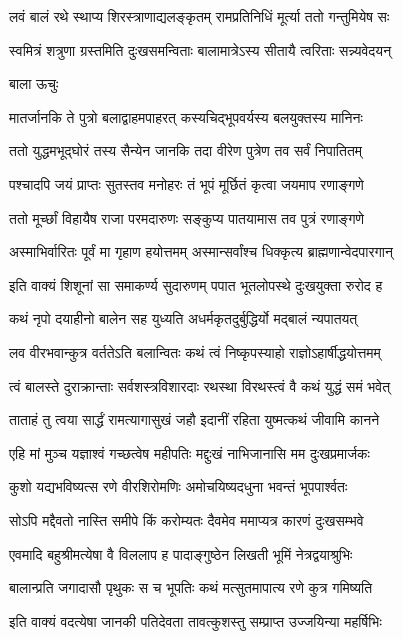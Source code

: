 \twolineshloka
{लवं बालं रथे स्थाप्य शिरस्त्राणाद्यलङ्कृतम्}
{रामप्रतिनिधिं मूर्त्या ततो गन्तुमियेष सः}%

\twolineshloka
{स्वमित्रं शत्रुणा ग्रस्तमिति दुःखसमन्विताः}
{बालामात्रेऽस्य सीतायै त्वरिताः सन्न्यवेदयन्}%

बाला ऊचुः

\twolineshloka
{मातर्जानकि ते पुत्रो बलाद्वाहमपाहरत्}
{कस्यचिद्भूपवर्यस्य बलयुक्तस्य मानिनः}%

\twolineshloka
{ततो युद्धमभूद्घोरं तस्य सैन्येन जानकि}
{तदा वीरेण पुत्रेण तव सर्वं निपातितम्}%

\twolineshloka
{पश्चादपि जयं प्राप्तः सुतस्तव मनोहरः}
{तं भूपं मूर्छितं कृत्वा जयमाप रणाङ्गणे}%

\twolineshloka
{ततो मूर्च्छां विहायैष राजा परमदारुणः}
{सङ्कुप्य पातयामास तव पुत्रं रणाङ्गणे}%

\twolineshloka
{अस्माभिर्वारितः पूर्वं मा गृहाण हयोत्तमम्}
{अस्मान्सर्वांश्च धिक्कृत्य ब्राह्मणान्वेदपारगान्}%

\twolineshloka
{इति वाक्यं शिशूनां सा समाकर्ण्य सुदारुणम्}
{पपात भूतलोपस्थे दुःखयुक्ता रुरोद ह}%


\twolineshloka
{कथं नृपो दयाहीनो बालेन सह युध्यति}
{अधर्मकृतदुर्बुद्धिर्यो मद्बालं न्यपातयत्}%

\twolineshloka
{लव वीरभवान्कुत्र वर्ततेऽति बलान्वितः}
{कथं त्वं निष्कृपस्याहो राज्ञोऽहार्षीद्धयोत्तमम्}%

\twolineshloka
{त्वं बालस्ते दुराक्रान्ताः सर्वशस्त्रविशारदाः}
{रथस्था विरथस्त्वं वै कथं युद्धं समं भवेत्}%

\twolineshloka
{ताताहं तु त्वया सार्द्धं रामत्यागासुखं जहौ}
{इदानीं रहिता युष्मत्कथं जीवामि कानने}%

\twolineshloka
{एहि मां मुञ्च यज्ञाश्वं गच्छत्वेष महीपतिः}
{मद्दुःखं नाभिजानासि मम दुःखप्रमार्जकः}%

\twolineshloka
{कुशो यद्यभविष्यत्स रणे वीरशिरोमणिः}
{अमोचयिष्यदधुना भवन्तं भूपपार्श्वतः}%

\twolineshloka
{सोऽपि मद्दैवतो नास्ति समीपे किं करोम्यतः}
{दैवमेव ममाप्यत्र कारणं दुःखसम्भवे}%

\twolineshloka
{एवमादि बहुश्रीमत्येषा वै विललाप ह}
{पादाङ्गुष्ठेन लिखती भूमिं नेत्रद्वयाश्रुभिः}%

\twolineshloka
{बालान्प्रति जगादासौ पृथुकः स च भूपतिः}
{कथं मत्सुतमापात्य रणे कुत्र गमिष्यति}%

\twolineshloka
{इति वाक्यं वदत्येषा जानकी पतिदेवता}
{तावत्कुशस्तु सम्प्राप्त उज्जयिन्या महर्षिभिः}%

